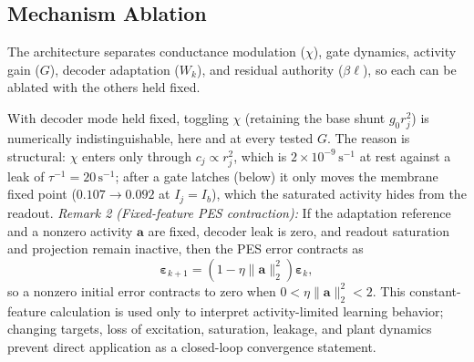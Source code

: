 \documentclass[letterpaper, 10 pt, conference]{ieeeconf}
\begin{document}

\subsection{Mechanism Ablation}
\label{sec:ablation}

The architecture separates conductance modulation ($\chi$), gate dynamics, activity gain ($G$), decoder adaptation ($W_k$), and residual authority ($\beta\bm\ell$), so each can be ablated with the others held fixed.

With decoder mode held fixed, toggling $\chi$ (retaining the base shunt $g_0r_j^2$) is numerically indistinguishable, here and at every tested $G$. The reason is structural: $\chi$ enters only through $c_j\propto r_j^2$, which is $2\times10^{-9}\,\mathrm{s}^{-1}$ at rest against a leak of $\tau^{-1}=20\,\mathrm{s}^{-1}$; after a gate latches (below) it only moves the membrane fixed point ($0.107\to0.092$ at $I_j=I_b$), which the saturated activity hides from the readout.
\textit{Remark 2 (Fixed-feature PES contraction):}\label{rem:pes}
If the adaptation reference and a nonzero activity $\bm a$ are fixed, decoder leak is zero, and readout saturation and projection remain inactive, then the PES error contracts as
\begin{equation}
 \bm\varepsilon_{k+1}=(1-\eta\|\bm a\|_2^2)\bm\varepsilon_k,
 \label{eq:contraction}
\end{equation}
so a nonzero initial error contracts to zero when $0<\eta\|\bm a\|_2^2<2$. This constant-feature calculation \cite{voelker2015pes} is used only to interpret activity-limited learning behavior; changing targets, loss of excitation, saturation, leakage, and plant dynamics prevent direct application as a closed-loop convergence statement.
\end{document}
